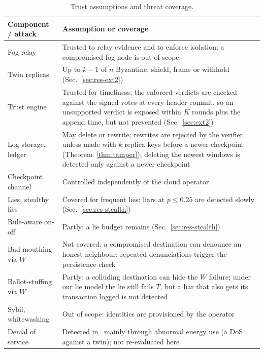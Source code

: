 \documentclass[lineno,pdflatex,sn-nature]{sn-jnl}
\theoremstyle{thmstyleone}%
\theoremstyle{thmstylethree}%
\begin{document}
\begin{table}[!t]
\caption{Trust assumptions and threat coverage.}
\label{tab:threats}
\centering
\renewcommand{\arraystretch}{1.1}
\footnotesize
\setlength{\tabcolsep}{2.5pt}
\begin{tabular}{p{} p{}}
\toprule
{Component / attack} & {Assumption or coverage} \\
\midrule
Fog relay & Trusted to relay evidence and to enforce isolation; a compromised fog node is out of scope \\
Twin replicas & Up to $k-1$ of $n$ Byzantine: shield, frame or withhold (Sec.~\ref{sec:res-ext2}) \\
Trust engine & Trusted for timeliness; the enforced verdicts are checked against the signed votes at every header commit, so an unsupported verdict is exposed within $K$ rounds plus the append time, but not prevented (Sec.~\ref{sec:ext2}) \\
Log storage, ledger & May delete or rewrite; rewrites are rejected by the verifier unless made with $k$ replica keys before a newer checkpoint (Theorem~\ref{thm:tamper}); deleting the newest windows is detected only against a newer checkpoint \\
Checkpoint channel & Controlled independently of the cloud operator \\
\midrule
Lies, stealthy lies & Covered for frequent lies; liars at $p\le0.25$ are detected slowly (Sec.~\ref{sec:res-stealth}) \\
Rule-aware on-off & Partly: a lie budget remains (Sec.~\ref{sec:res-stealth}) \\
Bad-mouthing via $W$ & Not covered: a compromised destination can denounce an honest neighbour; repeated denunciations trigger the persistence check \\
Ballot-stuffing via $W$ & Partly: a colluding destination can hide the $W$ failure; under our lie model the lie still fails $T$, but a liar that also gets its transaction logged is not detected \\
Sybil, whitewashing & Out of scope: identities are provisioned by the operator~\cite{douceur2002sybil,friedman2001social} \\
Denial of service & Detected in~\cite{soula2024iodt} mainly through abnormal energy use (a DoS against a twin); not re-evaluated here \\
\bottomrule
\end{tabular}
\end{table}
\end{document}
